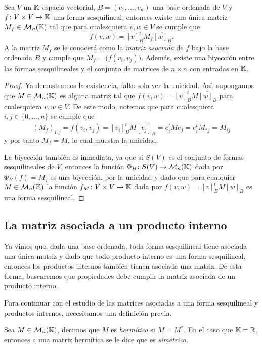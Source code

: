 \begin{teor}\label{teor:MAsocFS}
  Sea $V$ un $\mathbb{K}$-espacio vectorial, $B = (v_1,\ldots,v_n)$ una base ordenada de $V$ y $f\colon V\times V \to\mathbb{K}$ una forma sesquilineal, entonces existe una única matriz $M_f \in \mathcal{M}_n(\mathbb{K})$ tal que para cualesquiera $v,w \in V$ se cumple que
    \[
      f(v,w) =  [v]_B^t M_f \overline{[w]_B}.
    \]
    A la matriz $M_f$ se le conocerá como la \emph{matriz asociada} de $f$ bajo la base ordenada $B$ y cumple que $M_f = \bigl(f(v_i,v_j)\bigr)$. Además, existe una biyección entre las formas sesquilineales y el conjunto de matrices de $n\times n$ con entradas en $\mathbb{K}$.
\end{teor}
\begin{proof}
  Ya demostramos la existencia, falta solo ver la unicidad. Así, supongamos que $M \in \mathcal{M}_n(\mathbb{K})$ es alguna matriz tal que $f(v,w) =  [v]_B^t M \overline{[w]_B}$ para cualesquiera $v,w \in V$. De este modo, notemos que para cualesquiera $i,j \in \{0,\ldots,n\}$ se cumple que
    \[
      (M_f)_{i,j} = f(v_i,v_j) = [v_i]_B^t M \overline{[v_j]_B} = e_i^t M e_j = e_i^t M_{*j} = M_{ij}
    \]
  y por tanto $M_f = M$, lo cual muestra la unicidad.
  
  La biyección también es inmediata, ya que si $S(V)$ es el conjunto de formas sesquilineales de $V$, entonces la función $\Phi_B\colon S(V) \to \mathcal{M}_n(\mathbb{K})$ dada por $\Phi_B(f) = M_f$ es una biyección, por la unicidad y dado que para cualquier $M\in\mathcal{M}_n(\mathbb{K})$ la función $f_M\colon V\times V \to \mathbb{K}$ dada por $f(v,w) = [v]_B^t M \overline{[w]_B}$ es una forma sesquilineal.
\end{proof}

\subsection{La matriz asociada a un producto interno}

Ya vimos que, dada una base ordenada, toda forma sesquilineal tiene asociada una única matriz y dado que todo producto interno es una forma sesquilineal, entonces los productos internos también tienen asociada una matriz. De esta forma, buscaremos que propiedades debe cumplir la matriz asociada de un producto interno.

Para continuar con el estudio de las matrices asociadas a una forma sesquilineal y productos internos, necesitamos una definición previa.

\begin{defi}
  Sea $M \in \mathcal{M}_n(\mathbb{K})$, decimos que $M$ es \emph{hermítica} si $M = M^*$. En el caso que $\mathbb{K} = \mathbb{R}$, entonces a una matriz hermítica se le dice que es \emph{simétrica}.
\end{defi}

